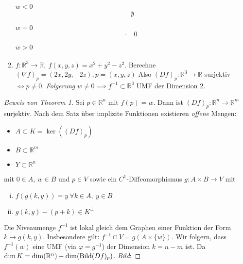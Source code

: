 \documentclass[../main.tex]{subfiles}
\begin{document}
\begin{examples}
\begin{enumerate}
    \begin{minipage}{2.5em} \emph{$w < 0$} \begin{align*} \emptyset \end{align*}
    \end{minipage}
    \qquad
    \begin{minipage}{5em} \emph{$w = 0$} \begin{align*} \Dot{} \quad 0 \end{align*}
    \end{minipage}
    \begin{minipage}{5em} \emph{$w > 0$} \begin{align*} \end{align*}
    \end{minipage}
    
    \item
    $f \colon \mathbb{R}^3 \to \mathbb{R}, \ f(x,y,z)=x^2+y^2-z^2$.
    Berechne $(\nabla f)_p = (2x, 2y, -2z), p = (x,y,z)$
    Also $(Df)_p \colon \mathbb{R}^3 \to \mathbb{R}$ surjektiv $\iff p \not = 0$.
    \emph{Folgerung} $w \not = 0 \implies f^{-1} \subset \mathbb{R}^3$ UMF der Dimension $2$.
\end{enumerate}
\end{examples}

\begin{proof}[Beweis von Theorem 1]
Sei $p \in \mathbb{R}^n$ mit $f(p)=w$. Dann ist $(Df)_p \colon \mathbb{R}^n \to \mathbb{R}^m$ surjektiv.
Nach dem Satz über implizite Funktionen existieren \emph{offene} Mengen:
\begin{itemize}
    \item $A \subset K = \ker\left((Df)_p\right)$
    \item $B \subset \mathbb{R}^m$
    \item $Y \subset \mathbb{R}^n$
\end{itemize}
mit $0\in A, \ w\in B$ und $p \in V$ sowie ein $C^1$-Diffeomorphismus $g\colon A \times B \to V$ mit
\begin{enumerate}[i)]
    \item $f(g(k,y))=y \ \forall k \in A, \ y\in B$
    \item $g(k,y) - (p+k) \in K^{\perp}$
\end{enumerate}
Die Niveaumenge $f^{-1}$ ist lokal gleich dem Graphen einer Funktion der Form $k \mapsto g(k,y)$.
Insbesondere gilt: $f^{-1} \cap V = g(A\times \{w\})$. Wir folgern, dass $f^{-1}(w)$ eine UMF (via $\varphi = g^{-1}$) der Dimension $k=n-m$ ist. Da $\dim K = \dim (\mathbb{R}^n)- \dim(\operatorname{Bild}(Df)_p)$. \newline \newline
\emph{Bild}:
\end{proof}
\end{document}
